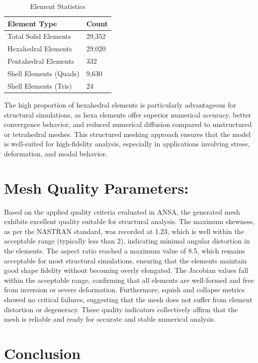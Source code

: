 \documentclass{book}
\begin{document}
\begin{itemize}[leftmargin=*,label=\textbullet]
\begin{itemize}
\begin{table}[h]
    \centering
    \caption{Element Statistics}
    \begin{tabular}{@{}ll@{}}
        \toprule
        Element Type          & Count   \\ \midrule
        Total Solid Elements  & 29,352  \\
        Hexahedral Elements   & 29,020  \\
        Pentahedral Elements  & 332     \\
        Shell Elements (Quads) & 9,630  \\
        Shell Elements (Tris)  & 24     \\ \bottomrule
    
    \end{tabular}
    \label{tab:element_stats}
\end{table}
The high proportion of hexahedral elements is particularly advantageous for structural simulations, as hexa elements offer superior numerical accuracy, better convergence behavior, and reduced numerical diffusion compared to unstructured or tetrahedral meshes. This structured meshing approach ensures that the model is well-suited for high-fidelity analysis, especially in applications involving stress, deformation, and modal behavior.
\section{Mesh Quality Parameters:}
Based on the applied quality criteria evaluated in ANSA, the generated mesh exhibits excellent quality suitable for structural analysis. The maximum skewness, as per the NASTRAN standard, was recorded at 1.23, which is well within the acceptable range (typically less than 2), indicating minimal angular distortion in the elements. The aspect ratio reached a maximum value of 8.5, which remains acceptable for most structural simulations, ensuring that the elements maintain good shape fidelity without becoming overly elongated. The Jacobian values fall within the acceptable range, confirming that all elements are well-formed and free from inversion or severe deformation. Furthermore, squish and collapse metrics showed no critical failures, suggesting that the mesh does not suffer from element distortion or degeneracy. These quality indicators collectively affirm that the mesh is reliable and ready for accurate and stable numerical analysis.

\section{Conclusion}


\end{itemize}
\end{itemize}
\end{document}

